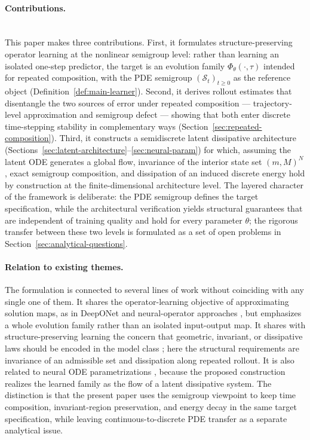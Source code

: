\documentclass[11pt]{article}
\newcommand{\cS}{\mathcal{S}}
\begin{document}
\paragraph{Contributions.}\leavevmode\\
This paper makes three contributions.
First, it formulates structure-preserving operator learning at the nonlinear semigroup level: rather than learning an isolated one-step predictor, the target is an evolution family \(\Phi_{\theta}(\cdot,\tau)\) intended for repeated composition, with the PDE semigroup \((\cS_t)_{t\ge 0}\) as the reference object (Definition~\ref{def:main-learner}).
Second, it derives rollout estimates that disentangle the two sources of error under repeated composition — trajectory-level approximation and semigroup defect — showing that both enter discrete time-stepping stability in complementary ways (Section~\ref{sec:repeated-composition}).
Third, it constructs a semidiscrete latent dissipative architecture (Sections~\ref{sec:latent-architecture}--\ref{sec:neural-param}) for which, assuming the latent ODE generates a global flow, invariance of the interior state set \((m,M)^N\), exact semigroup composition, and dissipation of an induced discrete energy hold by construction at the finite-dimensional architecture level.
The layered character of the framework is deliberate: the PDE semigroup defines the target specification, while the architectural verification yields structural guarantees that are independent of training quality and hold for every parameter \(\theta\); the rigorous transfer between these two levels is formulated as a set of open problems in Section~\ref{sec:analytical-questions}.

\paragraph{Relation to existing themes.}
The formulation is connected to several lines of work without coinciding with any single one of them. It shares the operator-learning objective of approximating solution maps, as in DeepONet and neural-operator approaches \cite{LuJinKarniadakis2021DeepONet,KovachkiLiLiuEtAl2023NeuralOperator,LiKovachkiAzizzadenesheliEtAl2021FNO}, but emphasizes a whole evolution family rather than an isolated input-output map. It shares with structure-preserving learning the concern that geometric, invariant, or dissipative laws should be encoded in the model class \cite{GreydanusDzambaYosinski2019HNN,JinZhangZhuTangKarniadakis2020SympNets,YuTianELi2021OnsagerNet}; here the structural requirements are invariance of an admissible set and dissipation along repeated rollout. It is also related to neural ODE parametrizations \cite{ChenRubanovaBettencourtDuvenaud2018NODE}, because the proposed construction realizes the learned family as the flow of a latent dissipative system. The distinction is that the present paper uses the semigroup viewpoint to keep time composition, invariant-region preservation, and energy decay in the same target specification, while leaving continuous-to-discrete PDE transfer as a separate analytical issue.
\end{document}
